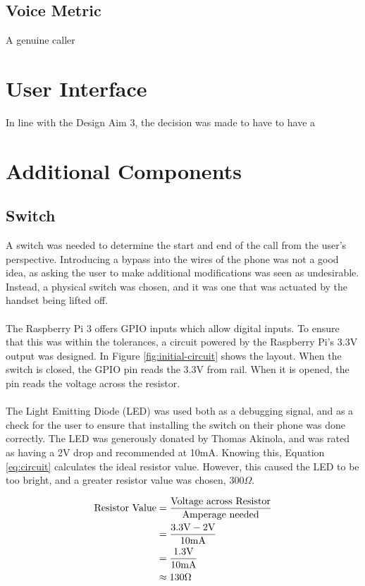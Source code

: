 \documentclass[main.tex]{subfiles}
\begin{document}
\subsection{Voice Metric}
A genuine caller

\section{User Interface}
In line with the Design Aim 3, the decision was made to have to have a

\section{Additional Components}
\subsection{Switch}
A switch was needed to determine the start and end of the call from the user's perspective. Introducing a bypass into the wires of the phone was not a good idea, as asking the user to make additional modifications was seen as undesirable. Instead, a physical switch was chosen, and it was one that was actuated by the handset being lifted off.
\\\\
The Raspberry Pi 3 offers GPIO inputs which allow digital inputs. To ensure that this was within the tolerances, a circuit powered by the Raspberry Pi's 3.3V output was designed. In Figure \ref{fig:initial-circuit} shows the layout. When the switch is closed, the GPIO pin reads the 3.3V from rail. When it is opened, the pin reads the voltage across the resistor.
\\\\
The Light Emitting Diode (LED) was used both as a debugging signal, and as a check for the user to ensure that installing the switch on their phone was done correctly. The LED was generously donated by Thomas Akinola, and was rated as having a 2V drop and recommended at 10mA. Knowing this, Equation \ref{eq:circuit} calculates the ideal resistor value. However, this caused the LED to be too bright, and a greater resistor value was chosen, $300\Omega$.

\begin{align}
	\text{Resistor Value} &= \frac{\text{Voltage across Resistor}}{\text{Amperage needed}}\notag\\
	&= \frac{3.3\text{V} - 2\text{V}}{10\text{mA}}\notag\\
	&= \frac{1.3\text{V}}{10\text{mA}}\notag\\
	&\approx 130\Omega\label{eq:circuit}
\end{align}
\end{document}
